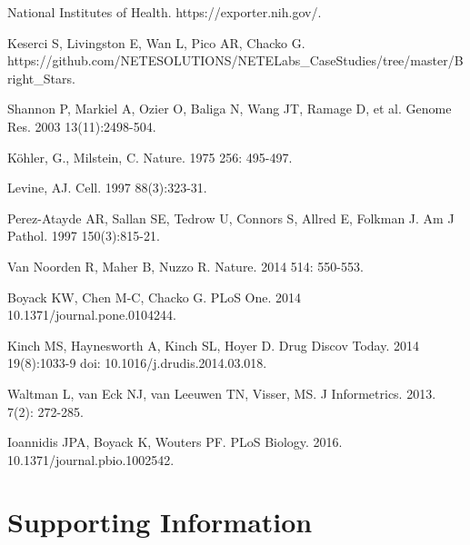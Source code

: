 \documentclass[10pt,letterpaper]{article}
\begin{document}
\begin{thebibliography}{10}
National Institutes of Health.
\newblock https://exporter.nih.gov/.

Keserci S, Livingston E, Wan L, Pico AR, Chacko G.
\newblock https://github.com/NETESOLUTIONS/NETELabs\_CaseStudies/tree/master/Bright\_Stars.

Shannon P, Markiel A, Ozier O, Baliga N, Wang JT, Ramage D, et al.
\newblock Genome Res. 2003 13(11):2498-504.

K\"ohler, G., Milstein, C.
\newblock Nature. 1975 256: 495-497.

Levine, AJ.
\newblock Cell. 1997 88(3):323-31.

Perez-Atayde AR, Sallan SE, Tedrow U, Connors S, Allred E, Folkman J.
\newblock Am J Pathol. 1997 150(3):815-21.

Van Noorden R, Maher B, Nuzzo R.
\newblock Nature. 2014 514: 550-553. 

Boyack KW, Chen M-C, Chacko G. 
\newblock  PLoS One. 2014 10.1371/journal.pone.0104244.

Kinch MS, Haynesworth A, Kinch SL, Hoyer D.
\newblock  Drug Discov Today. 2014 19(8):1033-9 doi: 10.1016/j.drudis.2014.03.018.

Waltman L, van Eck NJ, van Leeuwen TN, Visser, MS.
\newblock  J Informetrics. 2013. 7(2): 272-285.

Ioannidis JPA, Boyack K, Wouters PF.
\newblock  PLoS Biology. 2016. 10.1371/journal.pbio.1002542.

\section*{Supporting Information}


\end{thebibliography}
\end{document}

